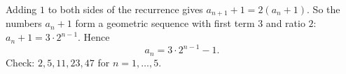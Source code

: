 Adding $1$ to both sides of the recurrence gives $a_{n+1}+1=2\left(a_n+1\right)$. So the numbers $a_n+1$ form a geometric sequence with first term $3$ and ratio $2$: $a_n+1=3\cdot2^{n-1}$. Hence
\[\boxed{a_n=3\cdot2^{n-1}-1}.\]
Check: $2,5,11,23,47$ for $n=1,\dots,5$.
